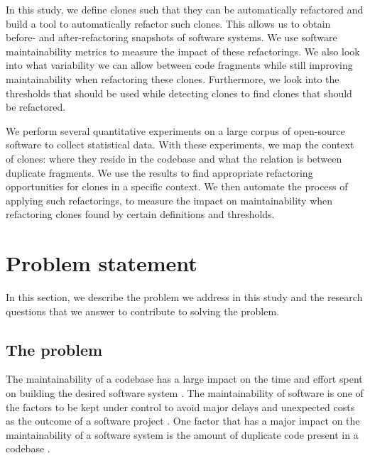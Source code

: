 In this study, we define clones such that they can be automatically refactored and build a tool to automatically refactor such clones. This allows us to obtain before- and after-refactoring snapshots of software systems. We use software maintainability metrics to measure the impact of these refactorings. We also look into what variability we can allow between code fragments while still improving maintainability when refactoring these clones. Furthermore, we look into the thresholds that should be used while detecting clones to find clones that should be refactored.

We perform several quantitative experiments on a large corpus of open-source software to collect statistical data. With these experiments, we map the context of clones: where they reside in the codebase and what the relation is between duplicate fragments. We use the results to find appropriate refactoring opportunities for clones in a specific context. We then automate the process of applying such refactorings, to measure the impact on maintainability when refactoring clones found by certain definitions and thresholds.

\section{Problem statement}
In this section, we describe the problem we address in this study and the research questions that we answer to contribute to solving the problem.

\subsection{The problem}
The maintainability of a codebase has a large impact on the time and effort spent on building the desired software system \cite{bakota2012cost, munson1978software}. The maintainability of software is one of the factors to be kept under control to avoid major delays and unexpected costs as the outcome of a software project \cite{fowler2018refactoring}. One factor that has a major impact on the maintainability of a software system is the amount of duplicate code present in a codebase \cite{heitlager2007practical, fowler1999refactoring}.

